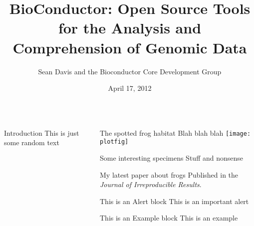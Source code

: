 \documentclass[final]{beamer}
\title{BioConductor:  Open Source Tools for the Analysis and Comprehension of Genomic Data}
\author{Sean Davis and the Bioconductor Core Development Group}
\date{April 17, 2012}
\begin{document}
\begin{frame}
  \vfill
  \begin{columns}[t]
    \begin{column}[t]{0.24\linewidth}
      \begin{block}{Introduction}
        This is just some random text
      \end{block}
    \end{column}
    \begin{column}[t]{0.75\linewidth}
      \begin{block}{The spotted frog habitat}
        Blah blah blah
        \texttt{[image: plotfig]}
      \end{block}
      
      \begin{block}{Some interesting specimens}
        Stuff and nonsense
      \end{block}
      
      \begin{block}{My latest paper about frogs}
        Published in the \emph{Journal of Irreproducible Results}.
      \end{block}

   \begin{alertblock}{This is an Alert block}
   This is an important alert
   \end{alertblock}
 
   \begin{exampleblock}{This is an Example block}
   This is an example 
   \end{exampleblock}

      \end{column}
    \end{columns}
  \end{frame}
\end{document}
